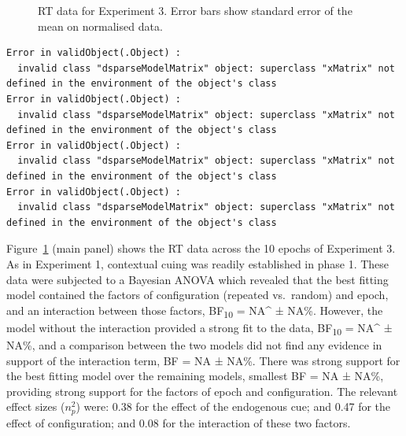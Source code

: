 \documentclass[
  man,
  floatsintext,
  longtable,
  nolmodern,
  notxfonts,
  notimes,
  colorlinks=true,linkcolor=blue,citecolor=blue,urlcolor=blue]{apa7}
\begin{document}
\begin{figure}[H]

\caption{\label{fig-RT-exp3}RT data for Experiment 3. Error bars show
standard error of the mean on normalised data.}


\end{figure}%

\begin{verbatim}
Error in validObject(.Object) : 
  invalid class "dsparseModelMatrix" object: superclass "xMatrix" not defined in the environment of the object's class
Error in validObject(.Object) : 
  invalid class "dsparseModelMatrix" object: superclass "xMatrix" not defined in the environment of the object's class
Error in validObject(.Object) : 
  invalid class "dsparseModelMatrix" object: superclass "xMatrix" not defined in the environment of the object's class
Error in validObject(.Object) : 
  invalid class "dsparseModelMatrix" object: superclass "xMatrix" not defined in the environment of the object's class
\end{verbatim}

Figure~\ref{fig-RT-exp3} (main panel) shows the RT data across the 10
epochs of Experiment 3. As in Experiment 1, contextual cuing was readily
established in phase 1. These data were subjected to a Bayesian ANOVA
which revealed that the best fitting model contained the factors of
configuration (repeated vs.~random) and epoch, and an interaction
between those factors, BF\textsubscript{10} = NA\^{} ± NA\%. However,
the model without the interaction provided a strong fit to the data,
BF\textsubscript{10} = NA\^{} ± NA\%, and a comparison between the two
models did not find any evidence in support of the interaction term, BF
= NA ± NA\%. There was strong support for the best fitting model over
the remaining models, smallest BF = NA ± NA\%, providing strong support
for the factors of epoch and configuration. The relevant effect sizes
(\(n^2_p\)) were: 0.38 for the effect of the endogenous cue; and 0.47
for the effect of configuration; and 0.08 for the interaction of these
two factors.
\end{document}
